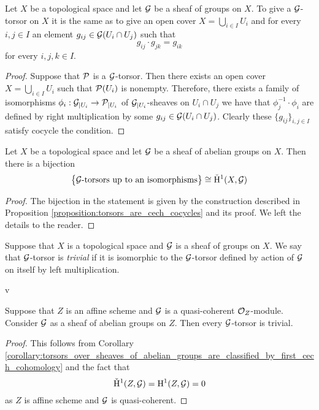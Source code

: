 \begin{proposition}\label{proposition:torsors_are_cech_cocycles}
Let $X$ be a topological space and let ${\mathcal G}$ be a sheaf of groups on $X$. To give a ${\mathcal G}$-torsor on $X$ it is the same as to give an open cover $X=\bigcup_{i\in I}U_i$ and for every $i,j\in I$ an element $g_{ij}\in {\mathcal G}(U_i\cap U_j)$ such that
$$g_{ij}\cdot g_{jk}=g_{ik}$$
for every $i,j,k\in I$.
\end{proposition}
\begin{proof}
Suppose that ${\mathcal P}$ is a ${\mathcal G}$-torsor. Then there exists an open cover $X=\bigcup_{i\in I}U_i$ such that ${\mathcal P}(U_i)$ is nonempty. Therefore, there exists a family of isomorphisms $\phi_i:{\mathcal G}_{\mid U_i}\rightarrow {\mathcal P}_{\mid U_i}$ of ${\mathcal G}_{\mid U_i}$-sheaves on $U_i\cap U_j$ we have that $\phi^{-1}_j\cdot \phi_i$ are defined by right multiplication by some $g_{ij}\in {\mathcal G}(U_i\cap U_j)$. Clearly these $\{g_{ij}\}_{i,j\in I}$ satisfy cocycle the condition.
\end{proof}

\begin{corollary}\label{corollary:torsors_over_sheaves_of_abelian_groups_are_classified_by_first_cech_cohomology}
Let $X$ be a topological space and let ${\mathcal G}$ be a sheaf of abelian groups on $X$. Then there is a bijection
$$\big\{\mbox{${\mathcal G}$-torsors up to an isomorphisms}\big\}\cong \check{\mathrm{H}}^1(X,{\mathcal G})$$
\end{corollary}
\begin{proof}
The bijection in the statement is given by the construction described in Proposition \ref{proposition:torsors_are_cech_cocycles} and its proof. We left the details to the reader.
\end{proof}

\begin{definition}
Suppose that $X$ is a topological space and ${\mathcal G}$ is a sheaf of groups on $X$. We say that ${\mathcal G}$-torsor is \textit{trivial} if it is isomorphic to the ${\mathcal G}$-torsor defined by action of ${\mathcal G}$ on itself by left multiplication. 
\end{definition}

v\begin{corollary}\label{corollary:torsors_over_quasi_coherent_modules_on_affine_schemes_are_trivial}
Suppose that $Z$ is an affine scheme and ${\mathcal G}$ is a quasi-coherent ${\mathcal O}_Z$-module. Consider ${\mathcal G}$ as a sheaf of abelian groups on $Z$. Then every ${\mathcal G}$-torsor is trivial.
\end{corollary}
\begin{proof}
This follows from Corollary \ref{corollary:torsors_over_sheaves_of_abelian_groups_are_classified_by_first_cech_cohomology} and the fact that
$$\check{\mathrm{H}}^1(Z,{\mathcal G}) = \mathrm{H}^1(Z,{\mathcal G}) = 0$$
as $Z$ is affine scheme and ${\mathcal G}$ is quasi-coherent.
\end{proof}


